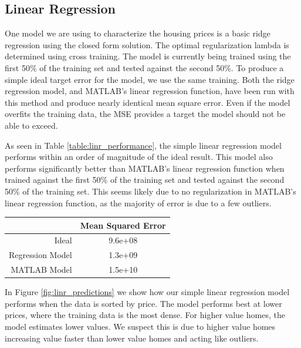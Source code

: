\documentclass[10pt]{article}
\begin{document}
	\begin{multicols}{2}
		\subsection{Linear Regression}
			One model we are using to characterize the housing prices is a basic ridge regression using the closed form solution. The optimal regularization lambda is determined using cross training. The model is currently being trained using the first 50\% of the training set and tested against the second 50\%. To produce a simple ideal target error for the model, we use the same training. Both the ridge regression model, and MATLAB's linear regression function, have been run with this method and produce nearly identical mean square error. Even if the model overfits the training data, the MSE provides a target the model should not be able to exceed.
		\par
			As seen in Table \ref{table:linr_performance}, the simple linear regression model performs within an order of magnitude of the ideal result. This model also performs significantly better than MATLAB's linear regression function when trained against the first 50\% of the training set and tested against the second 50\% of the training set. This seems likely due to no regularization in MATLAB's linear regression function, as the majority of error is due to a few outliers.
		\par
        	\captionsetup{type=table}
			\begin{tabular}{r|c}
				& \small{Mean Squared Error} \\
				\hline
				\small{Ideal} & \small{9.6e+08} \\
				\hline
				\small{Regression Model} & \small{1.3e+09} \\
				\hline
				\small{MATLAB Model} & \small{1.5e+10} \\
				\hline
			\end{tabular}
			\label{table:linr_performance}        
		\setlength{\parindent}{15pt}
		\par
			In Figure \ref{fig:linr_predictions} we show how our simple linear regression model performs when the data is sorted by price. The model performs best at lower prices, where the training data is the most dense. For higher value homes, the model estimates lower values. We suspect this is due to higher value homes increasing value faster than lower value homes and acting like outliers.
		\par

\end{multicols}
\end{document}
